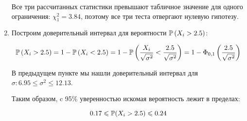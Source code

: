 \begin{problem}
\begin{sol}
\begin{enumerate}
Все три рассчитанных статистики превышают табличное значение для одного ограничения: $\chi^2_1 = 3.84$, поэтому все три теста отвергают нулевую гипотезу.

\item Построим доверительный интервал для вероятности $\P\left( X_i>2.5\right)$:

\[\P\left( X_i>2.5\right) = 1 - \P\left( X_i<2.5\right)  = 1 - \P\left(\frac{X_i}{\sqrt{\sigma^2}} < \frac{2.5}{\sqrt{\sigma^2}} \right) = 1 - \Phi_{0,1}\left( \frac{2.5}{\sqrt{\sigma^2}}\right) \]

В предыдущем пункте мы нашли доверительный интервал для $\sigma: 6.95 \leqslant \sigma^2 \leqslant 12.13$.

Таким образом, c 95\% уверенностью искомая вероятность лежит в пределах:

\[0.17 \leqslant \P(X_i>2.5) \leqslant 0.24\]
\end{enumerate}
\end{sol}
\end{problem}


